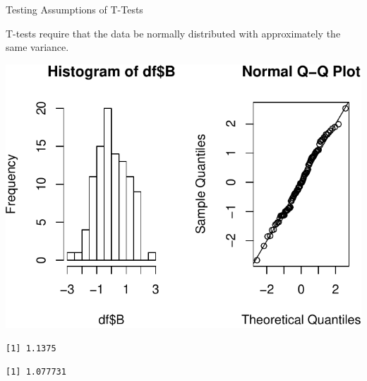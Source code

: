 \begin{frame}[fragile]{Testing Assumptions of T-Tests}

T-tests require that the data be normally distributed with approximately
the same variance.

\begin{Shaded}
\begin{Highlighting}[]
\NormalTok{(} \NormalTok{(}\NormalTok{,}\NormalTok{))}
\OperatorTok{$}
\OperatorTok{$}
\NormalTok{(}\NormalTok{, }\NormalTok{)}
\end{Highlighting}
\end{Shaded}

\includegraphics{04_BasicAnalyses_files/figure-beamer/unnamed-chunk-5-1.pdf}

\begin{Shaded}
\begin{Highlighting}[]
\OperatorTok{$}
\end{Highlighting}
\end{Shaded}

\begin{verbatim}
[1] 1.1375
\end{verbatim}

\begin{Shaded}
\begin{Highlighting}[]
\OperatorTok{$}
\end{Highlighting}
\end{Shaded}

\begin{verbatim}
[1] 1.077731
\end{verbatim}

\end{frame}

